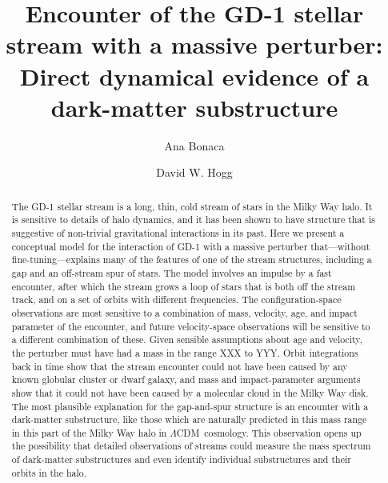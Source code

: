 \documentclass[12pt, modern]{aastex62}
\newcommand{\acronym}[1]{{\small{#1}}}
\newcommand{\lcdm}{\acronym{$\Lambda$CDM}}
\begin{document}
\sloppy\sloppypar\raggedbottom\frenchspacing

\title{\textbf{%
Encounter of the GD-1 stellar stream with a massive perturber:\\
Direct dynamical evidence of a dark-matter substructure
}}


\author[0000-0002-7846-9787]{Ana Bonaca}

\author[0000-0003-2866-9403]{David W. Hogg}

\begin{abstract}\noindent
The GD-1 stellar stream is a long, thin, cold stream of stars in the
Milky Way halo.
It is sensitive to details of halo dynamics, and it has been shown to
have structure that is suggestive of non-trivial gravitational
interactions in its past.
Here we present a conceptual model for the interaction of GD-1 with a
massive perturber that---without fine-tuning---explains many of the features of one of the
stream structures, including a gap and an off-stream spur of stars.
The model involves an impulse by a fast encounter, after which the
stream grows a loop of stars that is both off the stream track, and on
a set of orbits with different frequencies.
The configuration-space observations are most sensitive to a
combination of mass, velocity, age, and impact parameter of the
encounter, and future velocity-space observations will be sensitive to a
different combination of these.
Given sensible assumptions about age and velocity, the perturber
must have had a mass in the range XXX to YYY.
Orbit integrations back in time show that the stream encounter could not
have been caused by any known globular cluster or dwarf galaxy, and
mass and impact-parameter arguments show that it could not have been caused
by a molecular cloud in the Milky Way disk.
The most plausible explanation for the gap-and-spur structure is
an encounter with a dark-matter substructure, like those which are
naturally predicted in this mass range in this part of the Milky Way
halo in \lcdm\ cosmology.
This observation opens up the possibility that detailed observations of streams
could measure the mass spectrum of dark-matter substructures and even identify
individual substructures and their orbits in the halo.
\end{abstract}
\end{document}
